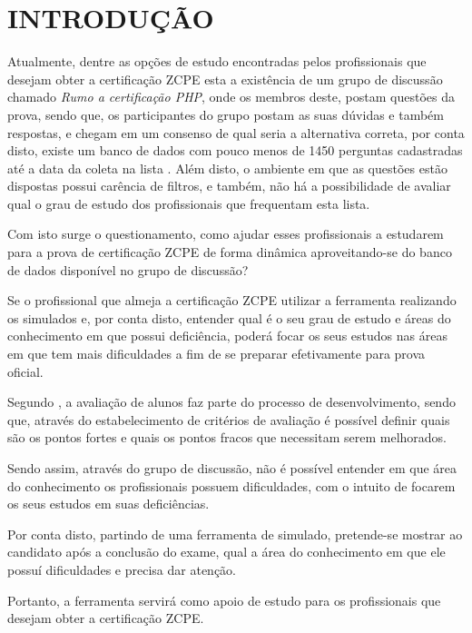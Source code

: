 \chapter{INTRODUÇÃO}
\label{chp:intro}

Atualmente, dentre as opções de estudo encontradas pelos
profissionais que desejam obter a certificação \ac{ZCPE} esta a existência de um
grupo de discussão chamado \textit{Rumo a certificação PHP}, onde os membros
deste, postam questões da prova, sendo que, os participantes do grupo postam as
suas dúvidas e também respostas, e chegam em um consenso de qual seria a
alternativa correta, por conta disto, existe um banco de dados com pouco menos
de 1450 perguntas cadastradas até a data da coleta na lista
\cite{googleGroupsRumoACertificaoPHP}. Além disto, o ambiente em que as
questões estão dispostas possui carência de filtros, e também, não há a
possibilidade de avaliar qual o grau de estudo dos profissionais que frequentam
esta lista.

Com isto surge o questionamento, como ajudar esses profissionais a estudarem
para a prova de certificação \acs{ZCPE} de forma dinâmica aproveitando-se do 
banco de dados disponível no grupo de discussão?


Se o profissional que almeja a certificação \acs{ZCPE} utilizar a ferramenta
realizando os simulados e, por conta disto, entender qual é o seu grau de estudo e áreas
do conhecimento em que possui deficiência, poderá focar os seus estudos
nas áreas em que tem mais dificuldades a fim de se preparar efetivamente para
prova oficial.


Segundo , a avaliação de
alunos faz parte do processo de desenvolvimento, sendo que, através do estabelecimento
de critérios de avaliação é possível definir quais são os pontos fortes e quais
os pontos fracos que necessitam serem melhorados.

Sendo assim, através do grupo de discussão, não é possível entender em
que área do conhecimento os profissionais possuem dificuldades, com o intuito de
focarem os seus estudos em suas deficiências.

Por conta disto, partindo de uma ferramenta de simulado, pretende-se mostrar ao
candidato após a conclusão do exame, qual a área do conhecimento em que ele
possuí dificuldades e precisa dar atenção.

Portanto, a ferramenta servirá como apoio de
estudo para os profissionais que desejam obter a certificação \acs{ZCPE}.

